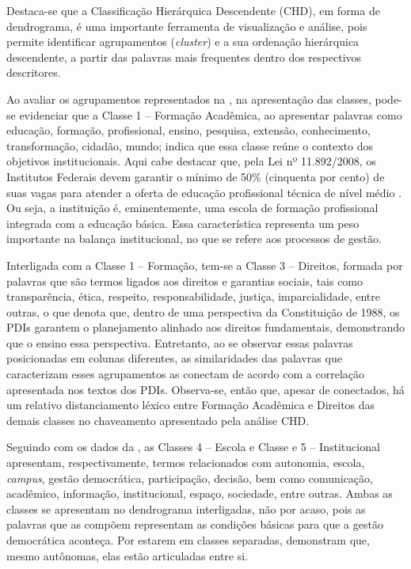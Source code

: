\documentclass[portuguese]{textolivre}
\begin{document}
Destaca-se que a Classificação Hierárquica Descendente (CHD), em forma de dendrograma, é uma importante ferramenta de visualização e análise, pois permite identificar agrupamentos (\textit{cluster}) e a sua ordenação hierárquica descendente, a partir das palavras mais frequentes dentro dos respectivos descritores.

Ao avaliar os agrupamentos representados na , na apresentação das classes, pode-se evidenciar que a Classe 1 – Formação Acadêmica, ao apresentar palavras como educação, formação, profissional, ensino, pesquisa, extensão, conhecimento, transformação, cidadão, mundo; indica que essa classe reúne o contexto dos objetivos institucionais. Aqui cabe destacar que, pela Lei nº 11.892/2008, os Institutos Federais devem garantir o mínimo de 50\% (cinquenta por cento) de suas vagas para atender a oferta de educação profissional técnica de nível médio \cite{silva_institutos_2009}. Ou seja, a instituição é, eminentemente, uma escola de formação profissional integrada com a educação básica. Essa característica representa um peso importante na balança institucional, no que se refere aos processos de gestão.

Interligada com a Classe 1 – Formação, tem-se a Classe 3 – Direitos, formada por palavras que são termos ligados aos direitos e garantias sociais, tais como transparência, ética, respeito, responsabilidade, justiça, imparcialidade, entre outras, o que denota que, dentro de uma perspectiva da Constituição de 1988, os PDIs garantem o planejamento alinhado aos direitos fundamentais, demonstrando que o ensino essa perspectiva. Entretanto, ao se observar essas palavras posicionadas em colunas diferentes, as similaridades das palavras que caracterizam esses agrupamentos as conectam de acordo com a correlação apresentada nos textos dos PDIs. Observa-se, então que, apesar de conectados, há um relativo distanciamento léxico entre Formação Acadêmica e Direitos das demais classes no chaveamento apresentado pela análise CHD.

Seguindo com os dados da , as Classes 4 – Escola e Classe e 5 – Institucional apresentam, respectivamente, termos relacionados com autonomia, escola, \textit{campus}, gestão democrática, participação, decisão, bem como comunicação, acadêmico, informação, institucional, espaço, sociedade, entre outras. Ambas as classes se apresentam no dendrograma interligadas, não por acaso, pois as palavras que as compõem representam as condições básicas para que a gestão democrática aconteça. Por estarem em classes separadas, demonstram que, mesmo autônomas, elas estão articuladas entre si.
\end{document}

